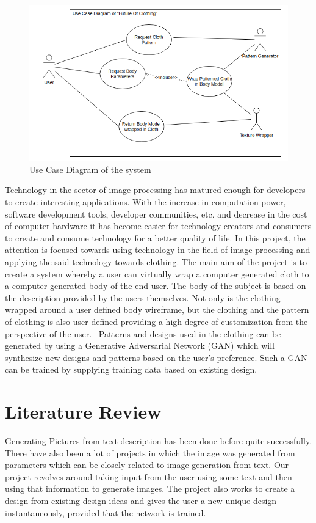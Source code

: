 \documentclass{article}
\begin{document}
\begin{figure}[h]
    \includegraphics[scale=0.6]{images/softwareDiagrams/FinalSystemUseCase.png}
    \centering
    \caption{Use Case Diagram of the system}
    
\end{figure}
Technology in the sector of image processing has matured enough for developers to create interesting applications. With the increase in computation power, software development tools, developer communities, etc. and decrease in the cost of computer hardware it has become easier for technology creators and consumers to create and consume technology for a better quality of life.
In this project, the attention is focused towards using technology in the field of image processing and applying the said technology towards clothing. The main aim of the project is to create a system whereby a user can virtually wrap a computer generated cloth to a computer generated body of the end user. The body of the subject is based on the description provided by the users themselves. Not only is the clothing wrapped around a user defined body wireframe, but the clothing and the pattern of clothing is also user defined providing a high degree of customization from the perspective of the user. 
Patterns and designs used in the clothing can be generated by using a Generative Adversarial Network (GAN) which will synthesize new designs and patterns based on the user’s preference. Such a GAN can be trained by supplying training data based on existing design.
\newpage
\section{Literature Review}

Generating Pictures from text description has been done before quite successfully. There have also been a lot of projects in which the image was generated from parameters which can be closely related to image generation from text. Our project revolves around taking input from the user using some text and then using that information to generate images. The project also works to create a design from existing design ideas and gives the user a new unique design instantaneously, provided that the network is trained.
\end{document}
